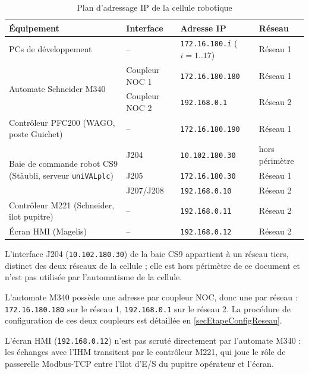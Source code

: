 \begin{table}[h]
    \centering
    \begin{tabular}{|p{4.2cm}|p{3.6cm}|p{3cm}|p{2.4cm}|}
        \hline
        \textbf{Équipement} & \textbf{Interface} & \textbf{Adresse IP} & \textbf{Réseau} \\
        \hline
        PCs de développement & -- & \texttt{172.16.180.\textit{i}} ($i=1..17$) & Réseau 1 \\
        \hline
        \multirow{2}{4.2cm}{Automate Schneider M340} & Coupleur NOC 1 & \texttt{172.16.180.180} & Réseau 1 \\
        \cline{2-4}
         & Coupleur NOC 2 & \texttt{192.168.0.1} & Réseau 2 \\
        \hline
        Contrôleur PFC200 (WAGO, poste Guichet) & -- & \texttt{172.16.180.190} & Réseau 1 \\
        \hline
        \multirow{3}{4.2cm}{Baie de commande robot CS9 (Stäubli, serveur \texttt{uniVALplc})} & J204 & \texttt{10.102.180.30} & hors périmètre \\
        \cline{2-4}
         & J205 & \texttt{172.16.180.30} & Réseau 1 \\
        \cline{2-4}
         & J207/J208 & \texttt{192.168.0.10} & Réseau 2 \\
        \hline
        Contrôleur M221 (Schneider, îlot pupitre) & -- & \texttt{192.168.0.11} & Réseau 2 \\
        \hline
        Écran HMI (Magelis) & -- & \texttt{192.168.0.12} & Réseau 2 \\
        \hline
    \end{tabular}
    \caption{Plan d'adressage IP de la cellule robotique}
    \label{tabAdressageReseau}
\end{table}

L'interface J204 (\texttt{10.102.180.30}) de la baie CS9 appartient à un
réseau tiers, distinct des deux réseaux de la cellule ; elle est hors
périmètre de ce document et n'est pas utilisée par l'automatisme de la
cellule.

L'automate M340 possède une adresse par coupleur NOC, donc une par réseau :
\texttt{172.16.180.180} sur le réseau 1, \texttt{192.168.0.1} sur le
réseau 2. La procédure de configuration de ces deux coupleurs est détaillée
en \ref{secEtapeConfigReseau}.

L'écran HMI (\texttt{192.168.0.12}) n'est pas scruté directement par
l'automate M340 : les échanges avec l'IHM transitent par le contrôleur
M221, qui joue le rôle de passerelle Modbus-TCP entre l'îlot d'E/S du
pupitre opérateur et l'écran.
